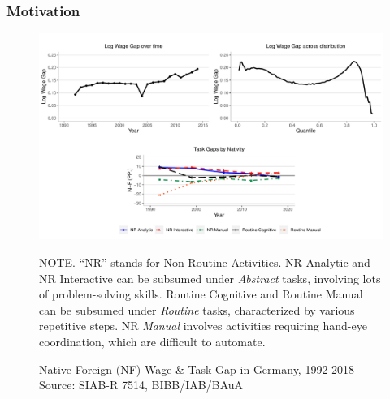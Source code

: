 \documentclass[10pt]{beamer}
\begin{document}
\begin{frame} 
	\frametitle{Motivation}
	
	
	\begin{figure}[H]
		\centering
		\begin{minipage}{0.90\textwidth} %
			\includegraphics[width=0.90\linewidth]{wgap_tgap}
			\caption{  Native-Foreign (NF) Wage \& Task Gap in Germany, 1992-2018 \\ 
				\medskip \centering \tiny Source: SIAB-R 7514, BIBB/IAB/BAuA \label{fig:wage_gap}}
			{\footnotesize \tiny NOTE. \textemdash ``NR'' stands for Non-Routine Activities. NR Analytic and NR Interactive can be subsumed under \textit{Abstract} tasks, involving lots of problem-solving skills. Routine Cognitive and Routine Manual can be subsumed under \textit{Routine} tasks, characterized by various repetitive steps. NR \textit{Manual} involves activities requiring hand-eye coordination, which are difficult to automate.  \par}
		\end{minipage}
	\end{figure}
	
	
	
\end{frame}
\end{document}
